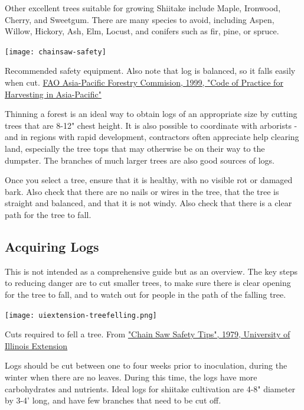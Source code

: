 \documentclass{tufte-handout}
\begin{document}
Other excellent trees suitable for growing Shiitake include Maple, Ironwood, Cherry, and Sweetgum.
There are many species to avoid, including Aspen, Willow, Hickory, Ash, Elm, Locust, and conifers such as fir, pine, or spruce.

\begin{marginfigure}
\texttt{[image: chainsaw-safety]}
\caption{Recommended safety equipment. Also note that log is balanced, so it falls easily when cut. \href{http://www.fao.org/docrep/004/ac142e/ac142e0g.htm}{FAO Asia-Pacific Forestry Commision, 1999, "Code of Practice for Harvesting in Asia-Pacific"}}
\end{marginfigure}

Thinning a forest is an ideal way to obtain logs of an appropriate size by cutting trees that are 8-12" chest height.
It is also possible to coordinate with arborists - and in regions with rapid development, contractors often appreciate help clearing land, especially the tree tops that may otherwise be on their way to the dumpster.
The branches of much larger trees are also good sources of logs.

Once you select a tree, ensure that it is healthy, with no visible rot or damaged bark.
Also check that there are no nails or wires in the tree, that the tree is straight and balanced, and that it is not windy. 
Also check that there is a clear path for the tree to fall.

\subsection{Acquiring Logs}


This is not intended as a comprehensive guide but as an overview.
The key steps to reducing danger are to cut smaller trees, to make sure there is clear opening for the tree to fall, and to watch out for people in the path of the falling tree.


\begin{marginfigure}
\texttt{[image: uiextension-treefelling.png]}
\caption{Cuts required to fell a tree. From \href{http://www.aces.uiuc.edu/vista/html_pubs/saw/saw.html}{"Chain Saw Safety Tips", 1979, University of Illinois Extension}}
\end{marginfigure}


Logs should be cut between one to four weeks prior to inoculation, during the winter when there are no leaves. 
During this time, the logs have more carbohydrates and nutrients. 
Ideal logs for shiitake cultivation are 4-8" diameter by 3-4' long, and have few branches that need to be cut off.
\end{document}
